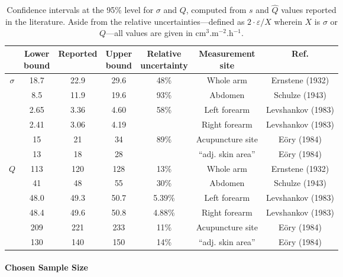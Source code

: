 \def\arraystretch{1.25}
\begin{table}
	\centering
	\begin{tabular}{c|c|c|c|c|c|c}
		& \specialcell{Lower\\bound} & Reported & \specialcell{Upper\\bound} & \specialcell{Relative \\uncertainty} & \specialcell{Measurement\\site} & Ref. \\ \hline
		\multirow{6}{*}{$\sigma$} & 18.7 & 22.9 & 29.6 & 48\% & Whole arm & Ernstene (1932)\cite{ernstene1932a} \\
		& 8.5 & 11.9 & 19.6 & 93\% & Abdomen & Schulze (1943)\cite{schulze1943} \\
		& 2.65 & 3.36 & 4.60 & \multirow{2}{*}{58\%} & Left forearm & Levshankov (1983)\cite{levshankov1983} \\
		& 2.41 & 3.06 & 4.19 & & Right forearm & Levshankov (1983)\cite{levshankov1983} \\
		& 15 & 21 & 34 & \multirow{2}{*}{89\%} & Acupuncture site & E{\"o}ry (1984)\cite{eory1984}\\
		& 13 & 18 & 28 & & \enquote{adj. skin area} & E{\"o}ry (1984)\cite{eory1984} \\ \hline
		\multirow{6}{*}{$Q$} & 113 & 120 & 128 & 13\% & Whole arm & Ernstene (1932)\cite{ernstene1932a} \\
		& 41 & 48 & 55 & 30\% & Abdomen & Schulze (1943)\cite{schulze1943} \\
		& 48.0 & 49.3 & 50.7 & 5.39\% & Left forearm & Levshankov (1983)\cite{levshankov1983} \\
		& 48.4 & 49.6 & 50.8 & 4.88\% & Right forearm & Levshankov (1983)\cite{levshankov1983} \\
		& 209 & 221 & 233 & 11\% & Acupuncture site & E{\"o}ry (1984)\cite{eory1984} \\
		& 130 & 140 & 150 & 14\% & \enquote{adj. skin area} & E{\"o}ry (1984)\cite{eory1984}
	\end{tabular}	
	\caption[Confidence intervals at the 95\% level for $\sigma$ and $Q$.]{Confidence intervals at the 95\% level for $\sigma$ and $Q$, computed from $s$ and $\widehat{Q}$ values reported in the literature. Aside from the relative uncertainties---defined as $2\cdot\varepsilon/X$ wherein $X$ is $\sigma$ or $Q$---all values are given in cm$^{3}$.m$^{-2}$.h$^{-1}$.}\label{table:tcco2:indic_estimation}
\end{table}

\paragraph{Chosen Sample Size}\mbox{}\\

